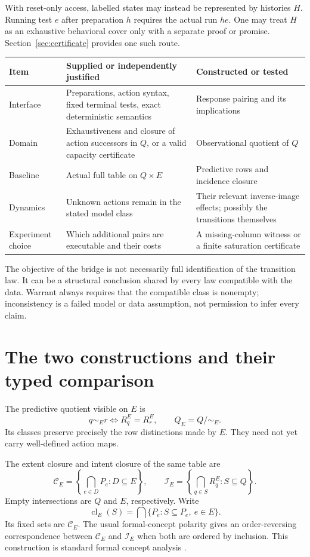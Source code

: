 \documentclass[11pt]{article}
\theoremstyle{remark}
\newcommand{\cl}{\operatorname{cl}}
\newcommand{\C}{\mathcal C}
\newcommand{\I}{\mathcal I}
\begin{document}
With reset-only access, labelled states may instead be represented by histories $H$. Running test $e$ after preparation $h$ requires the actual run $he$. One may treat $H$ as an exhaustive behavioral cover only with a separate proof or promise. Section~\ref{sec:certificate} provides one such route.

\begin{center}
\begin{tabularx}{\textwidth}{@{}p{}XX@{}}
\toprule
Item & Supplied or independently justified & Constructed or tested \\
\midrule
Interface & Preparations, action syntax, fixed terminal tests, exact deterministic semantics & Response pairing and its implications \\
Domain & Exhaustiveness and closure of action successors in $Q$, or a valid capacity certificate & Observational quotient of $Q$ \\
Baseline & Actual full table on $Q\times E$ & Predictive rows and incidence closure \\
Dynamics & Unknown actions remain in the stated model class & Their relevant inverse-image effects; possibly the transitions themselves \\
Experiment choice & Which additional pairs are executable and their costs & A missing-column witness or a finite saturation certificate \\
\bottomrule
\end{tabularx}
\end{center}

The objective of the bridge is not necessarily full identification of the transition law. It can be a structural conclusion shared by every law compatible with the data. Warrant always requires that the compatible class is nonempty; inconsistency is a failed model or data assumption, not permission to infer every claim.

\section{The two constructions and their typed comparison}
\label{sec:comparison}

The predictive quotient visible on $E$ is
\[
 q\sim_E r\Longleftrightarrow R_q^E=R_r^E,
 \qquad Q_E=Q/{\sim_E}.
\]
Its classes preserve precisely the row distinctions made by $E$. They need not yet carry well-defined action maps.

The extent closure and intent closure of the same table are
\[
 \C_E=\left\{\bigcap_{e\in D}P_e:D\subseteq E\right\},
 \qquad
 \I_E=\left\{\bigcap_{q\in S}R_q^E:S\subseteq Q\right\}.
\]
Empty intersections are $Q$ and $E$, respectively. Write
\[
 \cl_E(S)=\bigcap\{P_e:S\subseteq P_e,\ e\in E\}.
\]
Its fixed sets are $\C_E$. The usual formal-concept polarity gives an order-reversing correspondence between $\C_E$ and $\I_E$ when both are ordered by inclusion. This construction is standard formal concept analysis \cite{FCA}.
\end{document}

